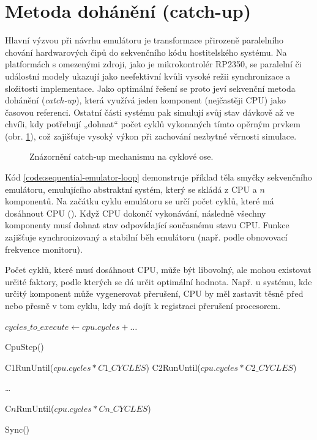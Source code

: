 \section{Metoda dohánění (catch-up)}
\label{tp:catch-up}

Hlavní výzvou při návrhu emulátoru je transformace přirozeně paralelního chování hardwarových čipů
do sekvenčního kódu hostitelského systému. Na platformách s omezenými zdroji, jako je mikrokontrolér
RP2350, se paralelní či událostní modely ukazují jako neefektivní kvůli vysoké režii synchronizace a
složitosti implementace. Jako optimální řešení se proto jeví sekvenční metoda dohánění
(\textit{catch-up}), která využívá jeden komponent (nejčastěji CPU) jako časovou referenci. Ostatní
části systému pak simulují svůj stav dávkově až ve chvíli, kdy potřebují „dohnat“ počet cyklů
vykonaných tímto opěrným prvkem (obr. \ref{fig:emu_cycle_axis}), což zajišťuje vysoký výkon při
zachování nezbytné věrnosti simulace.

\begin{figure}[htbp]
    \centering
    
    \caption{Znázornění catch-up mechanismu na cyklové ose.}
    \label{fig:emu_cycle_axis}
\end{figure}

Kód \ref{code:sequential-emulator-loop} demonstruje příklad těla smyčky sekvenčního emulátoru,
emulujícího abstraktní systém, který se skládá z CPU a $n$ komponentů. Na začátku cyklu emulátoru se
určí počet cyklů, které má dosáhnout CPU (). Když CPU dokončí vykonávání,
následně všechny komponenty musí dohnat stav odpovídající současnému stavu CPU. Funkce 
zajišťuje synchronizovaný a stabilní běh emulátoru (např. podle obnovovací frekvence monitoru).

Počet cyklů, které musí dosáhnout CPU, může být libovolný, ale mohou existovat určité faktory, podle
kterých se dá určit optimální hodnota. Např. u systému, kde určitý komponent může vygenerovat
přerušení, CPU by měl zastavit těsně před nebo přesně v tom cyklu, kdy má dojít k registraci
přerušení procesorem.


\begin{code}[H]
    \begin{algorithmic}
            \State $cycles\_to\_execute \gets cpu.cycles + \dots$

                \State CpuStep()
            \EndWhile

            \State C1RunUntil($cpu.cycles \ast C1\_CYCLES$)
            \State C2RunUntil($cpu.cycles \ast C2\_CYCLES$)

            \dots

            \State C$n$RunUntil($cpu.cycles \ast Cn\_CYCLES$)

            \State Sync()
        \EndWhile
    \end{algorithmic}
    \caption{Konceptuální realizace metody dohánění (\textit{catch-up}) pro více-komponentní systém.}
    \label{code:sequential-emulator-loop}
\end{code}

